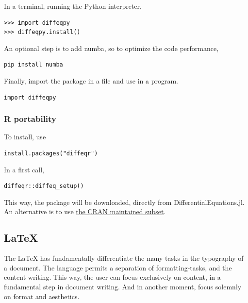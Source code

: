 \documentclass[
12pt,				%
openright,			%
oneside,			%
a4paper,			%
brazil,				%
english,			%
]{abntex2}
\begin{document}
In a terminal, running the Python interpreter,
\begin{verbatim}
>>> import diffeqpy
>>> diffeqpy.install()
\end{verbatim}

An optional step is to add numba, so to optimize the code performance,
\begin{verbatim}
pip install numba
\end{verbatim}

Finally, import the package in a file and use in a program.
\begin{verbatim}
import diffeqpy
\end{verbatim}

\subsubsection{R portability}

To install, use
\begin{verbatim}
install.packages("diffeqr")
\end{verbatim}

In a first call,
\begin{verbatim}
diffeqr::diffeq_setup()
\end{verbatim}

This way, the package will be downloaded, directly from
DifferentialEquations.jl. An alternative is to use
\href{https://cran.r-project.org/web/packages/diffeqr/index.html}{the
  CRAN maintained subset}.

\subsection{\LaTeX}

The \LaTeX{} has fundamentally differentiate the many tasks in the
typography of a document. The language permits a separation of
formatting-tasks, and the content-writing. This way, the user can
focus exclusively on content, in a fundamental step in document
writing. And in another moment, focus solemnly on format and
aesthetics.
\end{document}
